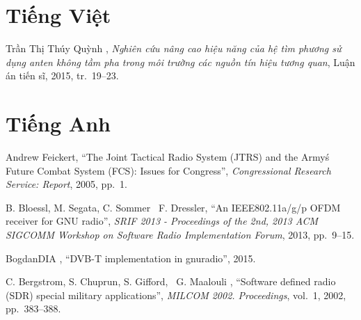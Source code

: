 \documentclass[a4paper,12pt,oneside]{book}%
\renewcommand{\baselinestretch}{1.4}
\begin{document}
\appendix

%
\def\baselinestretch{1}
\vspace{-2cm}
\renewcommand{\bibname}{Tài liệu tham khảo}
\renewcommand{\refname}{Literary works}
\begin{thebibliography}{xx}
	\section*{Tiếng Việt}
	\vspace{0.3cm}
	Trần Thị Thúy Quỳnh , {\em {Nghi{\^{e}}n cứu
			n{\^{a}}ng cao hiệu năng của hệ t{\`{i}}m phương sử dụng anten
			kh{\^{o}}ng tầm pha trong m{\^{o}}i trường c{\'{a}}c nguồn t{\'{i}}n
			hiệu tương quan}}, Luận án tiến sĩ, 2015, tr.~19--23.
	\vspace{0.5cm}	
	\section*{Tiếng Anh}	
	
	Andrew Feickert, ``{The Joint Tactical
		Radio System (JTRS) and the Army{\'{s}} Future Combat System (FCS): Issues
		for Congress}'', {\em Congressional Research Service: Report}, 2005, pp.~1.
	
	B. Bloessl, M. Segata, C. Sommer \harvardand\ F. Dressler, ``An IEEE802.11a/g/p OFDM receiver for GNU radio'',
	{\em SRIF 2013 - Proceedings of the 2nd, 2013 ACM SIGCOMM Workshop on
	Software Radio Implementation Forum}, 2013, pp.~9--15.

	BogdanDIA  , ``{DVB-T implementation in gnuradio}'', 2015.

	C. Bergstrom, S. Chuprun, S. Gifford, \harvardand\ G. Maalouli
	, ``{Software defined radio (SDR)
	special military applications}'', {\em MILCOM 2002. Proceedings},
	{vol.~1}, 2002, pp.~383--388.
	

\end{thebibliography}
\end{document}
